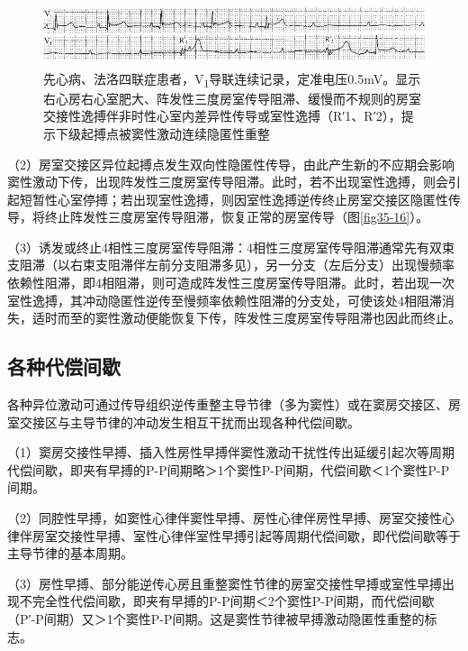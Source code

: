 \begin{figure}[!htbp]
 \centering
 \includegraphics[width=5.58333in,height=0.75in]{./images/Image00556.jpg}
 \captionsetup{justification=centering}
 \caption{先心病、法洛四联症患者，V\textsubscript{1}导联连续记录，定准电压0.5mV。显示右心房右心室肥大、阵发性三度房室传导阻滞、缓慢而不规则的房室交接性逸搏伴非时性心室内差异性传导或室性逸搏（R′1、R′2），提示下级起搏点被窦性激动连续隐匿性重整}
 \label{fig35-3}
  \end{figure} 


（2）房室交接区异位起搏点发生双向性隐匿性传导，由此产生新的不应期会影响窦性激动下传，出现阵发性三度房室传导阻滞。此时，若不出现室性逸搏，则会引起短暂性心室停搏；若出现室性逸搏，则因室性逸搏逆传终止房室交接区隐匿性传导，将终止阵发性三度房室传导阻滞，恢复正常的房室传导（图\ref{fig35-16}）。

（3）诱发或终止4相性三度房室传导阻滞：4相性三度房室传导阻滞通常先有双束支阻滞（以右束支阻滞伴左前分支阻滞多见），另一分支（左后分支）出现慢频率依赖性阻滞，即4相阻滞，则可造成阵发性三度房室传导阻滞。此时，若出现一次室性逸搏，其冲动隐匿性逆传至慢频率依赖性阻滞的分支处，可使该处4相阻滞消失，适时而至的窦性激动便能恢复下传，阵发性三度房室传导阻滞也因此而终止。

\protect\hypertarget{text00042.htmlux5cux23subid456}{}{}

\subsection{各种代偿间歇}

各种异位激动可通过传导组织逆传重整主导节律（多为窦性）或在窦房交接区、房室交接区与主导节律的冲动发生相互干扰而出现各种代偿间歇。

（1）窦房交接性早搏、插入性房性早搏伴窦性激动干扰性传出延缓引起次等周期代偿间歇，即夹有早搏的P-P间期略＞1个窦性P-P间期，代偿间歇＜1个窦性P-P间期。

（2）同腔性早搏，如窦性心律伴窦性早搏、房性心律伴房性早搏、房室交接性心律伴房室交接性早搏、室性心律伴室性早搏引起等周期代偿间歇，即代偿间歇等于主导节律的基本周期。

（3）房性早搏、部分能逆传心房且重整窦性节律的房室交接性早搏或室性早搏出现不完全性代偿间歇，即夹有早搏的P-P间期＜2个窦性P-P间期，而代偿间歇（P′-P间期）又＞1个窦性P-P间期。这是窦性节律被早搏激动隐匿性重整的标志。

